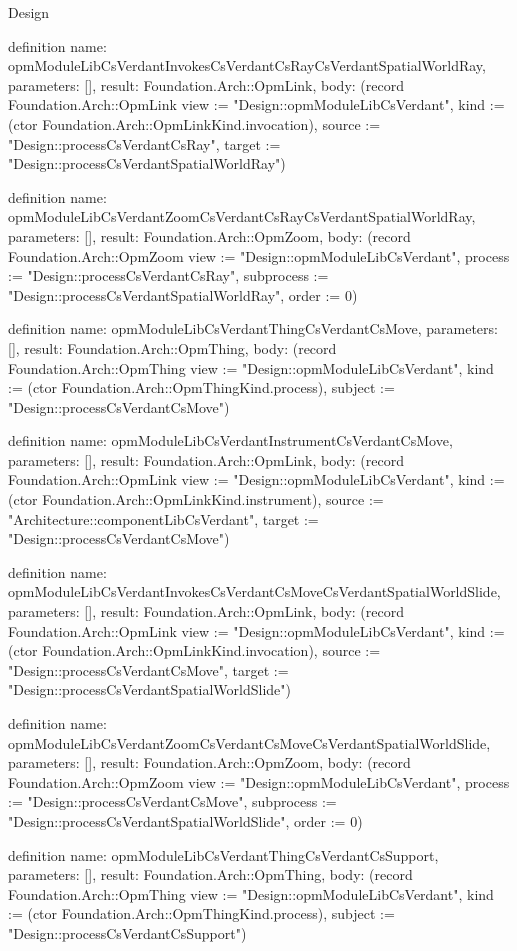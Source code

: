 \begin{lexlean}{Design}
\begin{semanticmodule}
definition{
  name: opmModuleLibCsVerdantInvokesCsVerdantCsRayCsVerdantSpatialWorldRay,
  parameters: [],
  result: Foundation.Arch::OpmLink,
  body: (record Foundation.Arch::OpmLink {view := "Design::opmModuleLibCsVerdant", kind := (ctor Foundation.Arch::OpmLinkKind.invocation), source := "Design::processCsVerdantCsRay", target := "Design::processCsVerdantSpatialWorldRay"})
}

definition{
  name: opmModuleLibCsVerdantZoomCsVerdantCsRayCsVerdantSpatialWorldRay,
  parameters: [],
  result: Foundation.Arch::OpmZoom,
  body: (record Foundation.Arch::OpmZoom {view := "Design::opmModuleLibCsVerdant", process := "Design::processCsVerdantCsRay", subprocess := "Design::processCsVerdantSpatialWorldRay", order := 0})
}

definition{
  name: opmModuleLibCsVerdantThingCsVerdantCsMove,
  parameters: [],
  result: Foundation.Arch::OpmThing,
  body: (record Foundation.Arch::OpmThing {view := "Design::opmModuleLibCsVerdant", kind := (ctor Foundation.Arch::OpmThingKind.process), subject := "Design::processCsVerdantCsMove"})
}

definition{
  name: opmModuleLibCsVerdantInstrumentCsVerdantCsMove,
  parameters: [],
  result: Foundation.Arch::OpmLink,
  body: (record Foundation.Arch::OpmLink {view := "Design::opmModuleLibCsVerdant", kind := (ctor Foundation.Arch::OpmLinkKind.instrument), source := "Architecture::componentLibCsVerdant", target := "Design::processCsVerdantCsMove"})
}

definition{
  name: opmModuleLibCsVerdantInvokesCsVerdantCsMoveCsVerdantSpatialWorldSlide,
  parameters: [],
  result: Foundation.Arch::OpmLink,
  body: (record Foundation.Arch::OpmLink {view := "Design::opmModuleLibCsVerdant", kind := (ctor Foundation.Arch::OpmLinkKind.invocation), source := "Design::processCsVerdantCsMove", target := "Design::processCsVerdantSpatialWorldSlide"})
}

definition{
  name: opmModuleLibCsVerdantZoomCsVerdantCsMoveCsVerdantSpatialWorldSlide,
  parameters: [],
  result: Foundation.Arch::OpmZoom,
  body: (record Foundation.Arch::OpmZoom {view := "Design::opmModuleLibCsVerdant", process := "Design::processCsVerdantCsMove", subprocess := "Design::processCsVerdantSpatialWorldSlide", order := 0})
}

definition{
  name: opmModuleLibCsVerdantThingCsVerdantCsSupport,
  parameters: [],
  result: Foundation.Arch::OpmThing,
  body: (record Foundation.Arch::OpmThing {view := "Design::opmModuleLibCsVerdant", kind := (ctor Foundation.Arch::OpmThingKind.process), subject := "Design::processCsVerdantCsSupport"})
}


\end{semanticmodule}
\end{lexlean}
